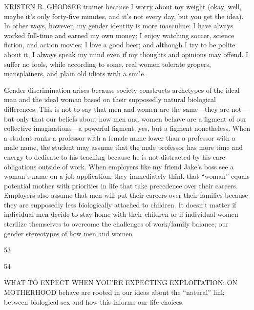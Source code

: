  \par 
KRISTEN R. GHODSEE trainer because I worry about my weight (okay, well, maybe it’s only forty-five minutes, and it’s not every day, but you get the idea). In other ways, however, my gender identity is more masculine: I have always worked full-time and earned my own money; I enjoy watching soccer, science fiction, and action movies; I love a good beer; and although I try to be polite about it, I always speak my mind even if my thoughts and opinions may offend. I suffer no fools, while according to some, real women tolerate gropers, mansplainers, and plain old idiots with a smile.
 \par 
Gender discrimination arises because society constructs archetypes of the ideal man and the ideal woman based on their supposedly natural biological differences. This is not to say that men and women are the same—they are not— but only that our beliefs about how men and women behave are a figment of our collective imaginations—a powerful figment, yes, but a figment nonetheless. When a student ranks a professor with a female name lower than a professor with a male name, the student may assume that the male professor has more time and energy to dedicate to his teaching because he is not distracted by his care obligations outside of work. When employers like my friend Jake’s boss see a woman’s name on a job application, they immediately think that “woman” equals potential mother with priorities in life that take precedence over their careers. Employers also assume that men will put their careers over their families because they are supposedly less biologically attached to children. It doesn’t matter if individual men decide to stay home with their children or if individual women sterilize themselves to overcome the challenges of work/family balance; our gender stereotypes of how men and women
 \par 
53
 \par 
54
 \par 
WHAT TO EXPECT WHEN YOU'RE EXPECTING EXPLOITATION: ON MOTHERHOOD behave are rooted in our ideas about the “natural” link between biological sex and how this informs our life choices.
 \par 
